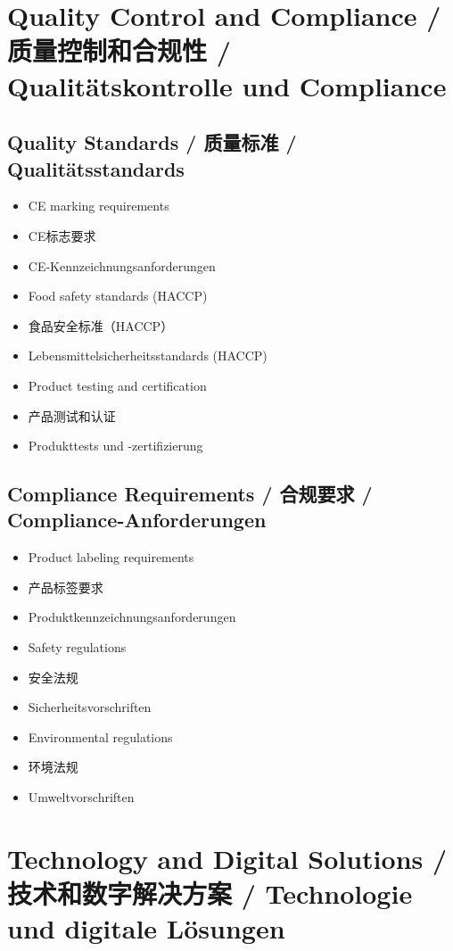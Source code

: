 \section{Quality Control and Compliance / 质量控制和合规性 / Qualitätskontrolle und Compliance}

\subsection{Quality Standards / 质量标准 / Qualitätsstandards}
\begin{itemize}
    \item CE marking requirements
    \item CE标志要求
    \item CE-Kennzeichnungsanforderungen
    \item Food safety standards (HACCP)
    \item 食品安全标准（HACCP）
    \item Lebensmittelsicherheitsstandards (HACCP)
    \item Product testing and certification
    \item 产品测试和认证
    \item Produkttests und -zertifizierung
\end{itemize}

\subsection{Compliance Requirements / 合规要求 / Compliance-Anforderungen}
\begin{itemize}
    \item Product labeling requirements
    \item 产品标签要求
    \item Produktkennzeichnungsanforderungen
    \item Safety regulations
    \item 安全法规
    \item Sicherheitsvorschriften
    \item Environmental regulations
    \item 环境法规
    \item Umweltvorschriften
\end{itemize}

\section{Technology and Digital Solutions / 技术和数字解决方案 / Technologie und digitale Lösungen}

